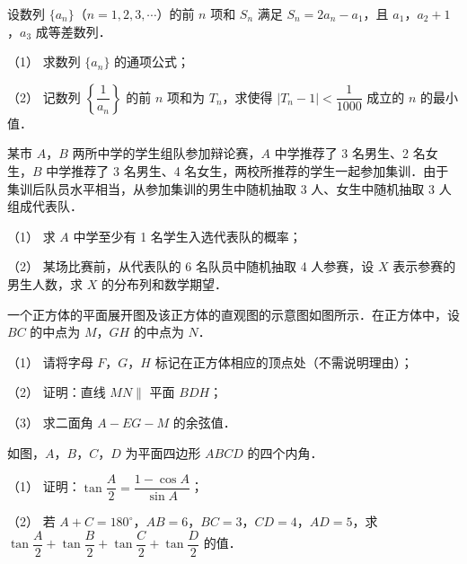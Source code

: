 \begin{question}
设数列 \(\{a_n\}\)（\(n=1,2,3,\cdots\)）的前 \(n\) 项和 \(S_n\) 满足 \(S_n=2a_n-a_1\)，且 \(a_1\)，\(a_2+1\)，\(a_3\) 成等差数列．

（1） 求数列 \(\{a_n\}\) 的通项公式；

（2） 记数列 \(\left\{\dfrac{1}{a_n}\right\}\) 的前 \(n\) 项和为 \(T_n\)，求使得 \(|T_n-1|<\dfrac{1}{1000}\) 成立的 \(n\) 的最小值．

\end{question}
\begin{question}
某市 \(A\)，\(B\) 两所中学的学生组队参加辩论赛，\(A\) 中学推荐了 3 名男生、2 名女生，\(B\) 中学推荐了 3 名男生、4 名女生，两校所推荐的学生一起参加集训．由于集训后队员水平相当，从参加集训的男生中随机抽取 3 人、女生中随机抽取 3 人组成代表队．

（1） 求 \(A\) 中学至少有 1 名学生入选代表队的概率；

（2） 某场比赛前，从代表队的 6 名队员中随机抽取 4 人参赛，设 \(X\) 表示参赛的男生人数，求 \(X\) 的分布列和数学期望．

\Needspace{0.4\textheight}
\end{question}
\begin{question}
一个正方体的平面展开图及该正方体的直观图的示意图如图所示．在正方体中，设 \(BC\) 的中点为 \(M\)，\(GH\) 的中点为 \(N\)．
\nopagebreak[4]
\begin{center}\end{center}
\nopagebreak[4]
（1） 请将字母 \(F\)，\(G\)，\(H\) 标记在正方体相应的顶点处（不需说明理由）；

（2） 证明：直线 \(MN\parallel\) 平面 \(BDH\)；

（3） 求二面角 \(A-EG-M\) 的余弦值．

\Needspace{0.4\textheight}
\end{question}
\begin{question}
如图，\(A\)，\(B\)，\(C\)，\(D\) 为平面四边形 \(ABCD\) 的四个内角．
\nopagebreak[4]
\begin{center}\end{center}
\nopagebreak[4]
（1） 证明：\(\tan\dfrac{A}{2}=\dfrac{1-\cos A}{\sin A}\)；

（2） 若 \(A+C=180^{\circ}\)，\(AB=6\)，\(BC=3\)，\(CD=4\)，\(AD=5\)，求 \(\tan\dfrac{A}{2}+\tan\dfrac{B}{2}+\tan\dfrac{C}{2}+\tan\dfrac{D}{2}\) 的值．

\Needspace{0.4\textheight}
\end{question}

